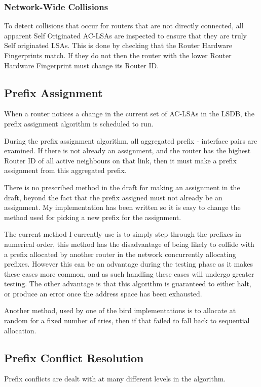 \documentclass[12pt]{report}
\begin{document}
\subsubsection{Network-Wide Collisions}
To detect collisions that occur for routers that are not directly connected,
all apparent Self Originated AC-LSAs are inspected to ensure that they are
truly Self originated LSAs. This is done by checking that the Router Hardware
Fingerprints match. If they do not then the router with the lower Router
Hardware Fingerprint must change its Router ID. 

\subsection{Prefix Assignment}
When a router notices a change in the current set of AC-LSAs in the LSDB, the
prefix assignment algorithm is scheduled to run. 

During the prefix assignment algorithm, all aggregated prefix - interface pairs
are examined. If there is not already an assignment, and the router has the
highest Router ID of all active neighbours on that link, then it must make a
prefix assignment from this aggregated prefix. 

There is no prescribed method in the draft for making an assignment in the
draft, beyond the fact that the prefix assigned must not already be an
assignment. My implementation has been written so it is easy to change the
method used for picking a new prefix for the assignment. 

The current method I currently use is to simply step through the prefixes in
numerical order, this method has the disadvantage of being likely to collide
with a prefix allocated by another router in the network concurrently allocating
prefixes.  However this can be an advantage during the testing phase as it
makes these cases more common, and as such handling these cases will undergo
greater testing. The other advantage is that this algorithm is guaranteed to
either halt, or produce an error once the address space has been exhausted. 

Another method, used by one of the bird implementations is to allocate at
random for a fixed number of tries, then if that failed to fall back to
sequential allocation. 


\subsection{Prefix Conflict Resolution}
Prefix conflicts are dealt with at many different levels in the algorithm. 
\end{document}
